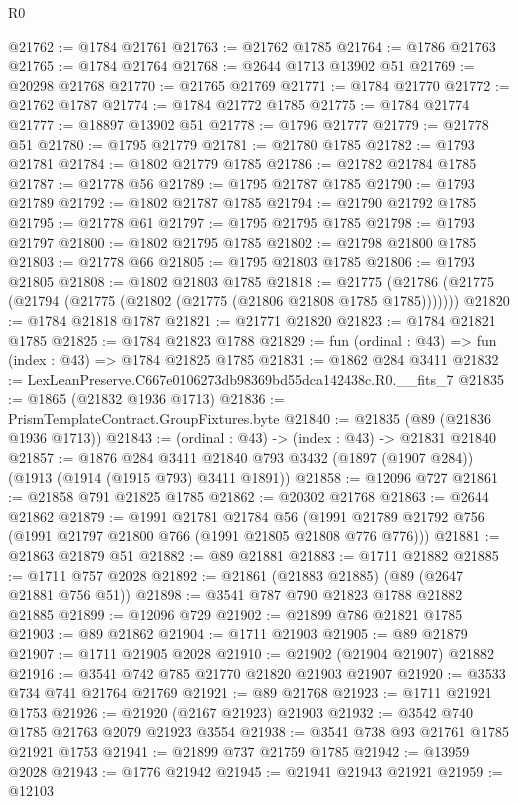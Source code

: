 \begin{lexlean}{R0}
\begin{coremodule}
@21762 := @1784 @21761
@21763 := @21762 @1785
@21764 := @1786 @21763
@21765 := @1784 @21764
@21768 := @2644 @1713 @13902 @51
@21769 := @20298 @21768
@21770 := @21765 @21769
@21771 := @1784 @21770
@21772 := @21762 @1787
@21774 := @1784 @21772 @1785
@21775 := @1784 @21774
@21777 := @18897 @13902 @51
@21778 := @1796 @21777
@21779 := @21778 @51
@21780 := @1795 @21779
@21781 := @21780 @1785
@21782 := @1793 @21781
@21784 := @1802 @21779 @1785
@21786 := @21782 @21784 @1785
@21787 := @21778 @56
@21789 := @1795 @21787 @1785
@21790 := @1793 @21789
@21792 := @1802 @21787 @1785
@21794 := @21790 @21792 @1785
@21795 := @21778 @61
@21797 := @1795 @21795 @1785
@21798 := @1793 @21797
@21800 := @1802 @21795 @1785
@21802 := @21798 @21800 @1785
@21803 := @21778 @66
@21805 := @1795 @21803 @1785
@21806 := @1793 @21805
@21808 := @1802 @21803 @1785
@21818 := @21775 (@21786 (@21775 (@21794 (@21775 (@21802 (@21775 (@21806 @21808 @1785 @1785)))))))
@21820 := @1784 @21818 @1787
@21821 := @21771 @21820
@21823 := @1784 @21821 @1785
@21825 := @1784 @21823 @1788
@21829 := fun (ordinal : @43) => fun (index : @43) => @1784 @21825 @1785
@21831 := @1862 @284 @3411
@21832 := LexLeanPreserve.C667e0106273db98369bd55dca142438c.R0.__fits_7
@21835 := @1865 (@21832 @1936 @1713)
@21836 := PrismTemplateContract.GroupFixtures.byte
@21840 := @21835 (@89 (@21836 @1936 @1713))
@21843 := (ordinal : @43) -> (index : @43) -> @21831 @21840
@21857 := @1876
    @284
    @3411
    @21840
    @793
    @3432
    (@1897 (@1907 @284))
    (@1913 (@1914 (@1915 @793) @3411 @1891))
@21858 := @12096 @727
@21861 := @21858 @791 @21825 @1785
@21862 := @20302 @21768
@21863 := @2644 @21862
@21879 := @1991
    @21781
    @21784
    @56
    (@1991 @21789 @21792 @756 (@1991 @21797 @21800 @766 (@1991 @21805 @21808 @776 @776)))
@21881 := @21863 @21879 @51
@21882 := @89 @21881
@21883 := @1711 @21882
@21885 := @1711 @757 @2028
@21892 := @21861 (@21883 @21885) (@89 (@2647 @21881 @756 @51))
@21898 := @3541 @787 @790 @21823 @1788 @21882 @21885
@21899 := @12096 @729
@21902 := @21899 @786 @21821 @1785
@21903 := @89 @21862
@21904 := @1711 @21903
@21905 := @89 @21879
@21907 := @1711 @21905 @2028
@21910 := @21902 (@21904 @21907) @21882
@21916 := @3541 @742 @785 @21770 @21820 @21903 @21907
@21920 := @3533 @734 @741 @21764 @21769
@21921 := @89 @21768
@21923 := @1711 @21921 @1753
@21926 := @21920 (@2167 @21923) @21903
@21932 := @3542 @740 @1785 @21763 @2079 @21923 @3554
@21938 := @3541 @738 @93 @21761 @1785 @21921 @1753
@21941 := @21899 @737 @21759 @1785
@21942 := @13959 @2028
@21943 := @1776 @21942
@21945 := @21941 @21943 @21921
@21959 := @12103

\end{coremodule}
\end{lexlean}
